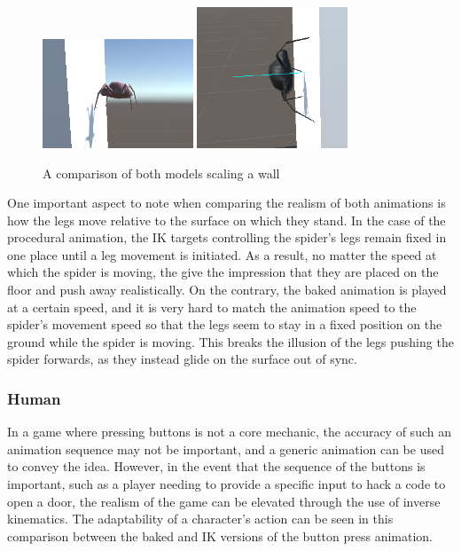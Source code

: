 \begin{figure}[h!]
    \centering
    \captionsetup{justification=centering}
    \includegraphics[width=0.4\textwidth]{grafika/sp_b_wall.png}
    \includegraphics[width=0.4\textwidth]{grafika/sp_ik_wall.png}
    \caption{A comparison of both models scaling a wall}
    \label{fig:sp_wall}
\end{figure}

One important aspect to note when comparing the realism of both animations is
how the legs move relative to the surface on which they stand. In the case of
the procedural animation, the IK targets controlling the spider's legs remain
fixed in one place until a leg movement is initiated. As a result, no matter the
speed at which the spider is moving, the give the impression that they are
placed on the floor and push away realistically. On the contrary, the baked
animation is played at a certain speed, and it is very hard to match the
animation speed to the spider's movement speed so that the legs seem to stay in a fixed
position on the ground while the spider is moving. This breaks the illusion of
the legs pushing the spider forwards, as they instead glide on the surface out
of sync.

\subsubsection{Human}
In a game where pressing buttons is not a core mechanic, the accuracy of such an
animation sequence may not be important, and a generic animation can be used to
convey the idea. However, in the event that the sequence of the buttons is
important, such as a player needing to provide a specific input to hack a code
to open a door, the realism of the game can be elevated through the use of
inverse kinematics. The adaptability of a character's action can be seen in this
comparison between the baked and IK versions of the button press animation.

